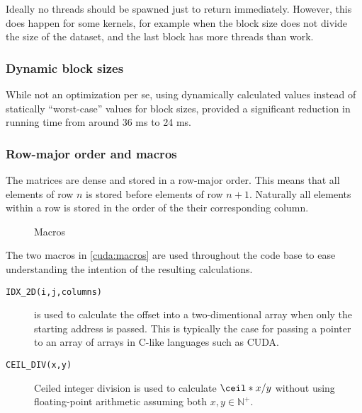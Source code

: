 Ideally no threads should be spawned just to return immediately. However, this
does happen for some kernels, for example when the block size does not divide
the size of the dataset, and the last block has more threads than work.

\subsubsection{Dynamic block sizes}
While not an optimization per se, using dynamically calculated values
instead of statically \enquote{worst-case} values for block sizes, provided
a significant reduction in running time from around 36 ms to 24 ms. 



\subsubsection{Row-major order and macros}

The matrices are dense and stored in a row-major order. This means that all
elements of row \(n\) is stored before elements of row \(n+1\). Naturally all
elements within a row is stored in the order of the their corresponding column.


\begin{figure}[H]
    \centering
    \caption{Macros}
    \label{cuda:macros}
\end{figure}

The two macros in \autoref{cuda:macros} are used throughout the code base to
ease understanding the intention of the resulting calculations.

\begin{description}

    \item[\texttt{IDX\_2D(i,j,columns)}] is used to calculate the
        offset into a two-dimentional array when only the starting address is
        passed. This is typically the case for passing a pointer to an array of
        arrays in C-like languages such as CUDA.

    \item[\texttt{CEIL\_DIV(x,y)}] Ceiled integer division is used to calculate
        \(\ceil*{x/y}\) without using floating-point arithmetic assuming both
        \(x, y \in \mathbb{N}^{+} \).

\end{description}

